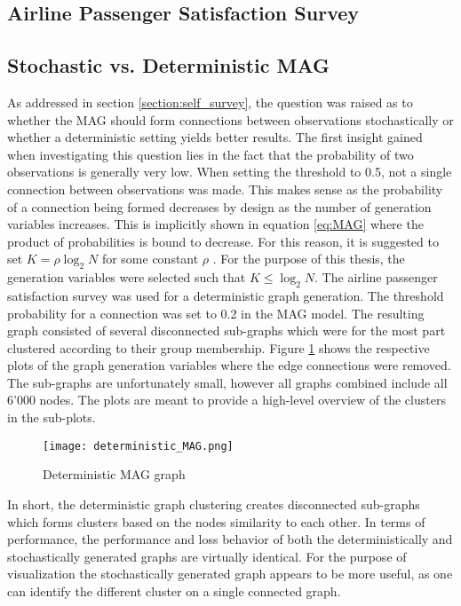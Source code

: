   \subsection{Airline Passenger Satisfaction Survey}


  \subsection{Stochastic vs. Deterministic MAG}

  As addressed in section \ref{section:self_survey}, the question was raised 
  as to whether the MAG should form connections between observations
  stochastically or whether a deterministic setting yields better results. The 
  first insight gained when investigating this question lies in the fact that 
  the probability of two observations is generally very low. When setting the 
  threshold to 0.5, not a single connection between observations was made. This
  makes sense as the probability of a connection being formed decreases by
  design as the number of generation variables increases. This is implicitly
  shown in equation \ref{eq:MAG} where the product of probabilities is bound to
  decrease. For this reason, it is suggested to set $K=\rho\log_{2}N$
  for some constant $\rho$ \citep[p. 122]{kim2012multiplicative}. For the
  purpose of this thesis, the generation variables were selected such that
  $K\leqslant\log_{2} N$. The airline passenger satisfaction survey was used
  for a deterministic graph generation. The threshold probability for a
  connection was set to 0.2 in the MAG model. The resulting graph consisted of
  several disconnected sub-graphs which were for the most part clustered
  according to their group membership. Figure \ref{fig:det_MAG} shows the
  respective plots of the graph generation variables where the edge connections
  were removed. The sub-graphs are unfortunately small, however all graphs
  combined include all 6'000 nodes. The plots are meant to provide a high-level
  overview of the clusters in the sub-plots. 

  \begin{figure}[h]
		\centering
		\texttt{[image: deterministic\_MAG.png]}
		\caption{Deterministic MAG graph}
        \label{fig:det_MAG}
  \end{figure}

  \noindent In short, the deterministic graph clustering creates disconnected 
  sub-graphs which forms clusters based on the nodes similarity to each other.
  In terms of performance, the performance and loss behavior of both the
  deterministically and stochastically generated graphs are virtually identical. 
  For the purpose of visualization the stochastically generated graph appears
  to be more useful, as one can identify the different cluster on a single
  connected graph.
  
